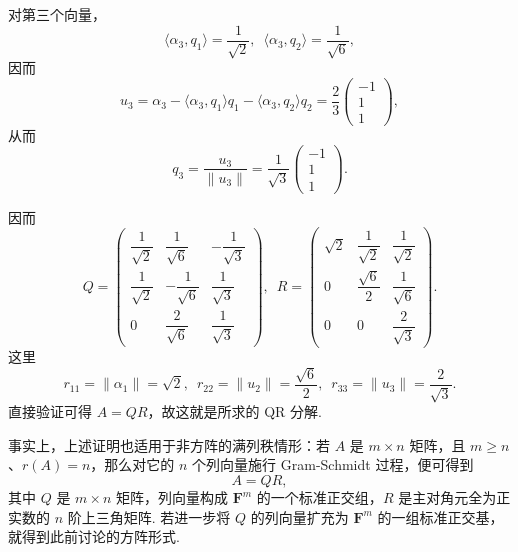 \begin{solution}
    对第三个向量，
    \[
        \langle \alpha_3, q_1 \rangle = \frac{1}{\sqrt{2}}, \enspace
        \langle \alpha_3, q_2 \rangle = \frac{1}{\sqrt{6}},
    \]
    因而
    \[
        u_3 = \alpha_3 - \langle \alpha_3, q_1 \rangle q_1 - \langle \alpha_3, q_2 \rangle q_2
        = \frac{2}{3}
        \begin{pmatrix}
            -1 \\
            1 \\
            1
        \end{pmatrix},
    \]
    从而
    \[
        q_3 = \frac{u_3}{\lVert u_3 \rVert}
        = \frac{1}{\sqrt{3}}
        \begin{pmatrix}
            -1 \\
            1 \\
            1
        \end{pmatrix}.
    \]

    因而
    \[
        Q = \begin{pmatrix}
            \dfrac{1}{\sqrt{2}} & \dfrac{1}{\sqrt{6}}  & -\dfrac{1}{\sqrt{3}} \\
            \dfrac{1}{\sqrt{2}} & -\dfrac{1}{\sqrt{6}} & \dfrac{1}{\sqrt{3}}  \\
            0                   & \dfrac{2}{\sqrt{6}}  & \dfrac{1}{\sqrt{3}}
        \end{pmatrix}, \enspace
        R = \begin{pmatrix}
            \sqrt{2} & \dfrac{1}{\sqrt{2}} & \dfrac{1}{\sqrt{2}} \\
            0        & \dfrac{\sqrt{6}}{2} & \dfrac{1}{\sqrt{6}} \\
            0        & 0                   & \dfrac{2}{\sqrt{3}}
        \end{pmatrix}.
    \]
    这里
    \[
        r_{11} = \lVert \alpha_1 \rVert = \sqrt{2}, \enspace
        r_{22} = \lVert u_2 \rVert = \frac{\sqrt{6}}{2}, \enspace
        r_{33} = \lVert u_3 \rVert = \frac{2}{\sqrt{3}}.
    \]
    直接验证可得 $A = QR$，故这就是所求的 QR 分解.
\end{solution}

事实上，上述证明也适用于非方阵的满列秩情形：若 $A$ 是 $m \times n$ 矩阵，且 $m \geqslant n$、$r(A) = n$，那么对它的 $n$ 个列向量施行 Gram-Schmidt 过程，便可得到
\[
    A = QR,
\]
其中 $Q$ 是 $m \times n$ 矩阵，列向量构成 $\mathbf{F}^m$ 的一个标准正交组，$R$ 是主对角元全为正实数的 $n$ 阶上三角矩阵. 若进一步将 $Q$ 的列向量扩充为 $\mathbf{F}^m$ 的一组标准正交基，就得到此前讨论的方阵形式.

